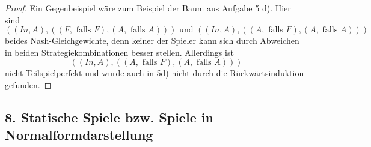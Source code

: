 \documentclass[12pt]{article}
\begin{document}
\begin{enumerate}[label=\alph*\upshape)]
\begin{proof}
			Ein Gegenbeispiel wäre zum Beispiel der Baum aus Aufgabe 5 d). Hier sind
					$$ \left( (In, A), \left( (F, \text{ falls } F), (A, \text{ falls } A) \right)  \right)  \text{ und }\left( (In, A), \left( (A, \text{ falls } F), (A, \text{ falls } A) \right)  \right)   $$
			beides Nash-Gleichgewichte, denn keiner der Spieler kann sich durch Abweichen in beiden Strategiekombinationen besser stellen. Allerdings ist $$ \left( (In, A), \left( (A, \text{ falls } F), (A, \text{ falls } A) \right)  \right) $$ nicht Teilspielperfekt und wurde auch in 5d) nicht durch die Rückwärtsinduktion gefunden. 
		\end{proof}
\end{enumerate}

\newpage

\subsection*{8. Statische Spiele bzw. Spiele in Normalformdarstellung}
\end{document}
